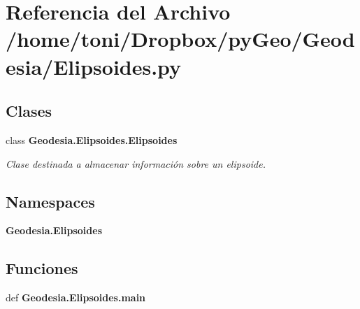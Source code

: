 \section{Referencia del Archivo /home/toni/\-Dropbox/py\-Geo/\-Geodesia/\-Elipsoides.py}
\label{Elipsoides_8py}
\subsection*{Clases}
\begin{DoxyCompactItemize}
\item 
class {\bf Geodesia.\-Elipsoides.\-Elipsoides}
\begin{DoxyCompactList}\small\item\em Clase destinada a almacenar información sobre un elipsoide. \end{DoxyCompactList}\end{DoxyCompactItemize}
\subsection*{Namespaces}
\begin{DoxyCompactItemize}
\item 
{\bf Geodesia.\-Elipsoides}
\end{DoxyCompactItemize}
\subsection*{Funciones}
\begin{DoxyCompactItemize}
\item 
def {\bf Geodesia.\-Elipsoides.\-main}
\end{DoxyCompactItemize}
